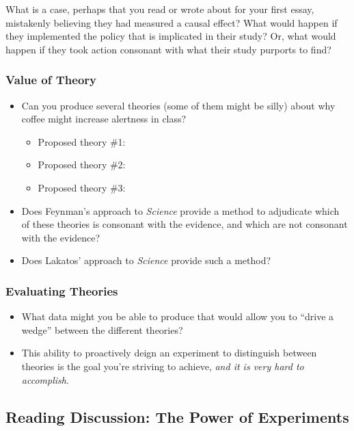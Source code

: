 \documentclass[
]{article}
\providecommand{\tightlist}{%
  \setlength{\itemsep}{0pt}\setlength{\parskip}{0pt}}
\begin{document}
What is a case, perhaps that you read or wrote about for your first essay, mistakenly believing they had measured a causal effect? What would happen if they implemented the policy that is implicated in their study? Or, what would happen if they took action consonant with what their study purports to find?

\hypertarget{value-of-theory}{%
\subsubsection{Value of Theory}\label{value-of-theory}}

\begin{itemize}
\tightlist
\item
  Can you produce several theories (some of them might be silly) about why coffee might increase alertness in class?

  \begin{itemize}
  \tightlist
  \item
    Proposed theory \#1:
  \item
    Proposed theory \#2:
  \item
    Proposed theory \#3:
  \end{itemize}
\item
  Does Feynman's approach to \emph{Science} provide a method to adjudicate which of these theories is consonant with the evidence, and which are not consonant with the evidence?
\item
  Does Lakatos' approach to \emph{Science} provide such a method?
\end{itemize}

\hypertarget{evaluating-theories}{%
\subsubsection{Evaluating Theories}\label{evaluating-theories}}

\begin{itemize}
\tightlist
\item
  What data might you be able to produce that would allow you to ``drive a wedge'' between the different theories?
\item
  This ability to proactively deign an experiment to distinguish between theories is the goal you're striving to achieve, \emph{and it is very hard to accomplish}.
\end{itemize}

\hypertarget{reading-discussion-the-power-of-experiments}{%
\subsection{Reading Discussion: The Power of Experiments}\label{reading-discussion-the-power-of-experiments}}
\end{document}
